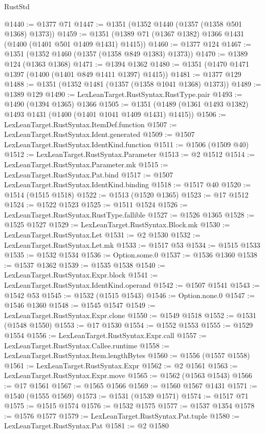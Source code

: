 \begin{lexlean}{RustStd}
\begin{coremodule}
{\begin{coremodule}
{{{{{{{{{{{{{{{{{{{{{{{{{{{{{{{{@1440 := @1377 @71
@1447 := @1351 (@1352 @1440 (@1357 (@1358 @501 @1368) @1373))
@1459 := @1351 (@1389 @71 (@1367 @1382) @1366 @1431 (@1400 (@1401 @501 @1409 @1431) @1415))
@1460 := @1377 @124
@1467 := @1351 (@1352 @1460 (@1357 (@1358 @849 @1383) @1373))
@1470 := @1389 @124 (@1363 @1368)
@1471 := @1394 @1362
@1480 := @1351 (@1470 @1471 @1397 (@1400 (@1401 @849 @1411 @1397) @1415))
@1481 := @1377 @129
@1488 := @1351 (@1352 @1481 (@1357 (@1358 @1041 @1368) @1373))
@1489 := @1389 @129
@1490 := LexLeanTarget.RustSyntax.RustType.pair
@1493 := @1490 (@1394 @1365) @1366
@1505 := @1351 (@1489 (@1361 @1493 @1382) @1493 @1431 (@1400 (@1401 @1041 @1409 @1431) @1415))
@1506 := LexLeanTarget.RustSyntax.ItemDef.function
@1507 := LexLeanTarget.RustSyntax.Ident.generated
@1509 := @1507 LexLeanTarget.RustSyntax.IdentKind.function
@1511 := @1506 (@1509 @40)
@1512 := LexLeanTarget.RustSyntax.Parameter
@1513 := @2 @1512
@1514 := LexLeanTarget.RustSyntax.Parameter.mk
@1515 := LexLeanTarget.RustSyntax.Pat.bind
@1517 := @1507 LexLeanTarget.RustSyntax.IdentKind.binding
@1518 := @1517 @40
@1520 := @1514 (@1515 @1518)
@1522 := @1513 (@1520 @1365)
@1523 := @17 @1512
@1524 := @1522 @1523
@1525 := @1511 @1524
@1526 := LexLeanTarget.RustSyntax.RustType.fallible
@1527 := @1526 @1365
@1528 := @1525 @1527
@1529 := LexLeanTarget.RustSyntax.Block.mk
@1530 := LexLeanTarget.RustSyntax.Let
@1531 := @2 @1530
@1532 := LexLeanTarget.RustSyntax.Let.mk
@1533 := @1517 @53
@1534 := @1515 @1533
@1535 := @1532 @1534
@1536 := Option.some.{0}
@1537 := @1536 @1360
@1538 := @1537 @1362
@1539 := @1535 @1538
@1540 := LexLeanTarget.RustSyntax.Expr.block
@1541 := LexLeanTarget.RustSyntax.IdentKind.operand
@1542 := @1507 @1541
@1543 := @1542 @53
@1545 := @1532 (@1515 @1543)
@1546 := Option.none.{0}
@1547 := @1546 @1360
@1548 := @1545 @1547
@1549 := LexLeanTarget.RustSyntax.Expr.clone
@1550 := @1549 @1518
@1552 := @1531 (@1548 @1550)
@1553 := @17 @1530
@1554 := @1552 @1553
@1555 := @1529 @1554
@1556 := LexLeanTarget.RustSyntax.Expr.call
@1557 := LexLeanTarget.RustSyntax.Callee.runtime
@1558 := LexLeanTarget.RustSyntax.Item.lengthBytes
@1560 := @1556 (@1557 @1558)
@1561 := LexLeanTarget.RustSyntax.Expr
@1562 := @2 @1561
@1563 := LexLeanTarget.RustSyntax.Expr.move
@1565 := @1562 (@1563 @1543)
@1566 := @17 @1561
@1567 := @1565 @1566
@1569 := @1560 @1567 @1431
@1571 := @1540 (@1555 @1569)
@1573 := @1531 (@1539 @1571)
@1574 := @1517 @71
@1575 := @1515 @1574
@1576 := @1532 @1575
@1577 := @1537 @1354
@1578 := @1576 @1577
@1579 := LexLeanTarget.RustSyntax.Pat.tuple
@1580 := LexLeanTarget.RustSyntax.Pat
@1581 := @2 @1580
}}}}}}}}}}}}}}}}}}}}}}}}}}}}}}}}
\end{coremodule}}
\end{coremodule}
\end{lexlean}

